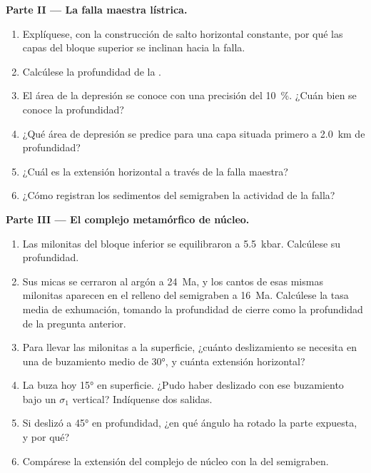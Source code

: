 \begin{problem}
\medskip\noindent\textbf{Parte II --- La falla maestra lístrica.}
\begin{enumerate}[resume]
  \item Explíquese, con la construcción de salto horizontal constante, por qué las capas del bloque superior
        se inclinan hacia la falla.
  \item Calcúlese la profundidad de la .
  \item El área de la depresión se conoce con una precisión del \qty{10}{\percent}. ¿Cuán bien se conoce la
        profundidad?
  \item ¿Qué área de depresión se predice para una capa situada primero a \qty{2.0}{km}
        de profundidad?
  \item ¿Cuál es la extensión horizontal a través de la falla maestra?
  \item ¿Cómo registran los sedimentos del semigraben la actividad de la
        falla?
\end{enumerate}

\medskip\noindent\textbf{Parte III --- El complejo metamórfico de núcleo.}
\begin{enumerate}[resume]
  \item Las milonitas del bloque inferior se equilibraron a \qty{5.5}{kbar}. Calcúlese
        su profundidad.
  \item Sus micas se cerraron al argón a \qty{24}{Ma}, y los cantos de esas mismas
        milonitas aparecen en el relleno del semigraben a \qty{16}{Ma}. Calcúlese la tasa media de
        exhumación, tomando la profundidad de cierre como la profundidad de la
        pregunta anterior.
  \item Para llevar las milonitas a la superficie, ¿cuánto deslizamiento se necesita en una  de buzamiento medio de \ang{30}, y cuánta extensión horizontal?
  \item La  buza hoy \ang{15} en superficie. ¿Pudo haber
        deslizado con ese buzamiento bajo un $\sigma_1$ vertical? Indíquense dos salidas.
  \item Si deslizó a \ang{45} en profundidad, ¿en qué ángulo ha rotado la
        parte expuesta, y por qué?
  \item Compárese la extensión del complejo de núcleo con la del
        semigraben.
\end{enumerate}


\end{problem}
